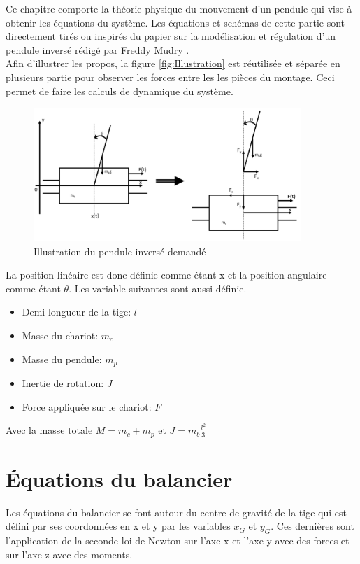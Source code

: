 Ce chapitre comporte la théorie physique du mouvement d'un pendule qui vise à obtenir les équations du système. Les équations et schémas de
cette partie sont directement tirés ou inspirés du papier sur la modélisation et régulation d'un pendule inversé rédigé par Freddy Mudry \cite{FreddyMudry}.\\

Afin d'illustrer les propos, la figure \ref{fig:Illustration} est réutilisée et séparée en plusieurs partie pour observer les forces entre les
les pièces du montage. Ceci permet de faire les calculs de dynamique du système.

\begin{figure}[H]
  \centering
  \includegraphics[width = 0.9\textwidth]{assets/figures/SchemaPhysiquePendule.svg}
  \caption{Illustration du pendule inversé demandé}
  \label{fig:Illustration2}
\end{figure}

La position linéaire est donc définie comme étant x et la position angulaire comme étant $\theta$. Les variable suivantes sont aussi définie.

\begin{itemize}
  \item Demi-longueur de la tige: $l$
  \item Masse du chariot: $m_c$
  \item Masse du pendule: $m_p$
  \item Inertie de rotation: $J$
  \item Force appliquée sur le chariot: $F$
\end{itemize}

Avec la masse totale $M = m_c + m_p$ et $J = m_b\frac{l^2}{3}$

\section{Équations du balancier}\label{sec:EqBal}
Les équations du balancier se font autour du centre de gravité de la tige qui est défini par ses coordonnées en x et y par les variables $x_G$
et $y_G$. Ces dernières sont l'application de la seconde loi de Newton sur l'axe x et l'axe y avec des forces et sur l'axe z avec des moments.

